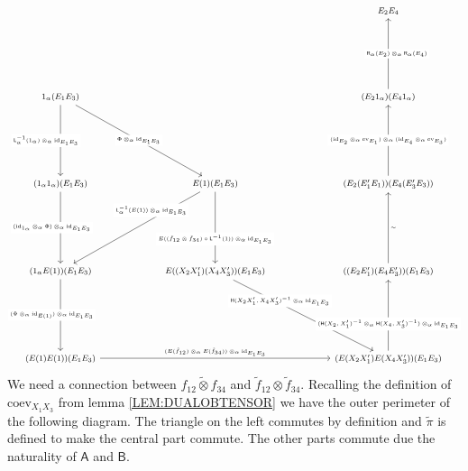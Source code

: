 \begin{prf}
\begin{enumerate}
\begin{equation*}
\begin{tikzcd}[row sep=7em,column sep=6em,font=\footnotesize,every label/.append style={font=\tiny}]
  &
  &
  E_{2} E_{4}
  \\
  1_{\alpha} (E_{1} E_{3})
  \ar{rd}[description]{\Phi \otimes_{\alpha} \mathrm{id}_{E_{1} E_{3}}}
  \ar{d}[description,xshift=-5mm]{\mathsf{L}_{\alpha}^{-1}(1_{\alpha}) \otimes_{\alpha} \mathrm{id}_{E_{1} E_{3}}}
  &
  &
  (E_{2} 1_{\alpha}) (E_{4} 1_{\alpha})
  \ar{u}[description,xshift=3mm]{\mathsf{R}_{\alpha}(E_{2}) \otimes_{\alpha} \mathsf{R}_{\alpha}(E_{4})}
  \\
  (1_{\alpha} 1_{\alpha}) (E_{1} E_{3})
  \ar{d}[description,xshift=-3mm]{(\mathrm{id}_{1_{\alpha}} \otimes_{\alpha} \Phi) \otimes_{\alpha} \mathrm{id}_{E_{1} E_{3}}}
  &
  E(1) (E_{1} E_{3})
  \ar{d}[description,yshift=-4mm]{E((\tilde{f}_{12} \otimes \tilde{f}_{34}) \circ \mathsf{L}^{-1}(1)) \otimes_{\alpha} \mathrm{id}_{E_{1} E_{3}}}
  \ar{dl}[description,xshift=5mm,yshift=6mm]{\mathsf{L}_{\alpha}^{-1}(E(1)) \otimes_{\alpha} \mathrm{id}_{E_{1} E_{3}}}
  &
  (E_{2} (E_{1}^{\prime} E_{1})) (E_{4} (E_{3}^{\prime} E_{3}))
  \ar{u}[description]{(\mathrm{id}_{E_{2}} \otimes_{\alpha} \mathrm{ev}_{E_{1}}) \otimes_{\alpha} (\mathrm{id}_{E_{4}} \otimes_{\alpha} \mathrm{ev}_{E_{3}})}
  \\
  (1_{\alpha} E(1)) (E_{1} E_{3})
  \ar{d}[description,xshift=-3mm]{(\Phi \otimes_{\alpha} \mathrm{id}_{E(1)}) \otimes_{\alpha} \mathrm{id}_{E_{1} E_{3}}}
  &
  E((X_{2} X_{1}^{\prime}) (X_{4} X_{3}^{\prime})) (E_{1} E_{3})
  \ar{rd}[description,xshift=-8mm,yshift=5mm]{\mathsf{H}(X_{2} X_{1}^{\prime},X_{4} X_{3}^{\prime})^{-1} \otimes_{\alpha} \mathrm{id}_{E_{1} E_{3}}}
  &
  ((E_{2} E_{1}^{\prime}) (E_{4} E_{3}^{\prime})) (E_{1} E_{3})
  \ar{u}[swap]{\sim}
  \\
  (E(1) E(1)) (E_{1} E_{3})
  \ar{rr}{(E(\tilde{f}_{12}) \otimes_{\alpha} E(\tilde{f}_{34})) \otimes_{\alpha} \mathrm{id}_{E_{1} E_{3}}}
  &
  &
  (E(X_{2} X_{1}^{\prime}) E(X_{4} X_{3}^{\prime})) (E_{1} E_{3})
  \ar{u}[description,yshift=-3mm]{(\mathsf{H}(X_{2},X_{1}^{\prime})^{-1} \otimes_{\alpha} \mathsf{H}(X_{4},X_{3}^{\prime})^{-1}) \otimes_{\alpha} \mathrm{id}_{E_{1} E_{3}}}
\end{tikzcd}
\end{equation*}
\newpage
We need a connection between $\widetilde{f_{12} \otimes f_{34}}$ and $\tilde{f}_{12} \otimes \tilde{f}_{34}$. Recalling the definition of $\mathrm{coev}_{X_{1} X_{3}}$ from lemma \ref{LEM:DUALOBTENSOR} we have the outer perimeter of the following diagram. The triangle on the left commutes by definition and $\tilde{\pi}$ is defined to make the central part commute. The other parts commute due the naturality of $\mathsf{A}$ and $\mathsf{B}$.

\end{enumerate}
\end{prf}
